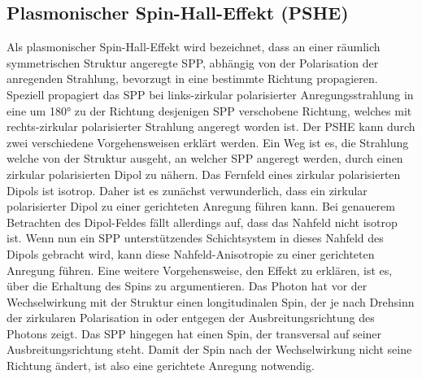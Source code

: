 \documentclass[titlepage]{article}
\begin{document}
	\subsection{Plasmonischer Spin-Hall-Effekt (PSHE)}
	Als plasmonischer Spin-Hall-Effekt wird bezeichnet, dass an einer räumlich symmetrischen Struktur angeregte SPP, abhängig von der Polarisation der anregenden Strahlung, bevorzugt in eine bestimmte Richtung propagieren. Speziell propagiert das SPP bei links-zirkular polarisierter Anregungsstrahlung in eine um 180° zu der Richtung desjenigen SPP verschobene Richtung, welches mit rechts-zirkular polarisierter Strahlung angeregt worden ist. Der PSHE kann durch zwei verschiedene Vorgehensweisen erklärt werden. Ein Weg ist es, die Strahlung welche von der Struktur ausgeht, an welcher SPP angeregt werden, durch einen zirkular polarisierten Dipol zu nähern. Das Fernfeld eines zirkular polarisierten Dipols ist isotrop. Daher ist es zunächst verwunderlich, dass ein zirkular polarisierter Dipol zu einer gerichteten Anregung führen kann. Bei genauerem Betrachten des Dipol-Feldes fällt allerdings auf, dass das Nahfeld nicht isotrop ist. Wenn nun ein SPP unterstützendes Schichtsystem in dieses Nahfeld des Dipols gebracht wird, kann diese Nahfeld-Anisotropie zu einer gerichteten Anregung führen.
	Eine weitere Vorgehensweise, den Effekt zu erklären, ist es, über die Erhaltung des Spins zu argumentieren. Das Photon hat vor der Wechselwirkung mit der Struktur einen longitudinalen Spin, der je nach Drehsinn der zirkularen Polarisation in oder entgegen der Ausbreitungsrichtung des Photons zeigt. Das SPP hingegen hat einen Spin, der transversal auf seiner Ausbreitungsrichtung steht. Damit der Spin nach der Wechselwirkung nicht seine Richtung ändert, ist also eine gerichtete Anregung notwendig.
\end{document}
